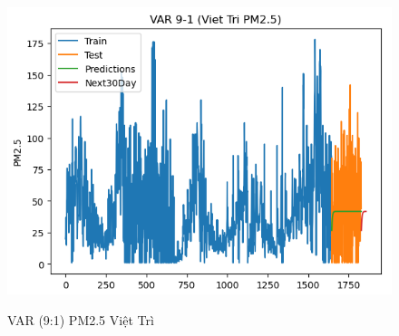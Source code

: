 \begin{figure}[h]
\begin{minipage}[b]{0.45\linewidth}
        \includegraphics[width=\linewidth]{img/VAR_9_1_VT.png}
        \caption{\scriptsize VAR (9:1) PM2.5 Việt Trì}
        \label{fig1}
    \end{minipage}\hfill
    \begin{minipage}[b]{0.45\linewidth}
        \centering
        \label{fig2}
    \end{minipage}
\end{figure}
\vspace{3cm}